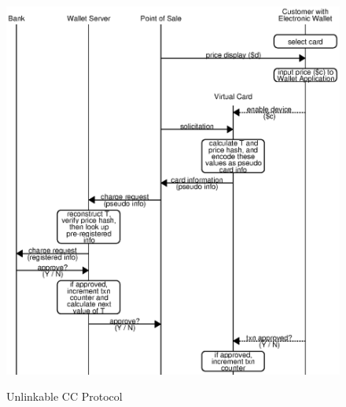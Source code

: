 \begin{figure}[h!]
  \caption{Unlinkable CC Protocol}
  \centering
    \includegraphics{img/unlinkable-3.eps}
  \label{fig:unlinkable-3}
\end{figure}

